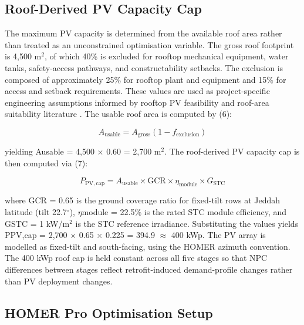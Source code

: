 \documentclass[journal,fleqn]{IEEEtran}
\begin{document}
\par

\subsection{Roof-Derived PV Capacity Cap}

The maximum PV capacity is determined from the available roof area rather than treated as an unconstrained optimisation variable. The gross roof footprint is 4,500 m$^{2}$, of which 40\% is excluded for rooftop mechanical equipment, water tanks, safety-access pathways, and constructability setbacks. The exclusion is composed of approximately 25\% for rooftop plant and equipment and 15\% for access and setback requirements. These values are used as project-specific engineering assumptions informed by rooftop PV feasibility and roof-area suitability literature \cite{ref04,ref06}. The usable roof area is computed by (6):


\begin{equation}\label{eq:usable-area}A_{\mathrm{usable}}=A_{\mathrm{gross}}(1-f_{\mathrm{exclusion}})\end{equation}

yielding Ausable = 4,500 $\times$ 0.60 = 2,700 m$^{2}$. The roof-derived PV capacity cap is then computed via (7):


\begin{equation}\label{eq:pv-cap}P_{\mathrm{PV,cap}}=A_{\mathrm{usable}}\times\mathrm{GCR}\times\eta_{\mathrm{module}}\times G_{\mathrm{STC}}\end{equation}

where GCR = 0.65 is the ground coverage ratio for fixed-tilt rows at Jeddah latitude (tilt 22.7$^{\circ}$), $\eta$module = 22.5\% is the rated STC module efficiency, and GSTC = 1 kW/m$^{2}$ is the STC reference irradiance. Substituting the values yields PPV,cap = 2,700 $\times$ 0.65 $\times$ 0.225 = 394.9 $\approx$ 400 kWp. The PV array is modelled as fixed-tilt and south-facing, using the HOMER azimuth convention. The 400 kWp roof cap is held constant across all five stages so that NPC differences between stages reflect retrofit-induced demand-profile changes rather than PV deployment changes.


\subsection{HOMER Pro Optimisation Setup}
\end{document}
